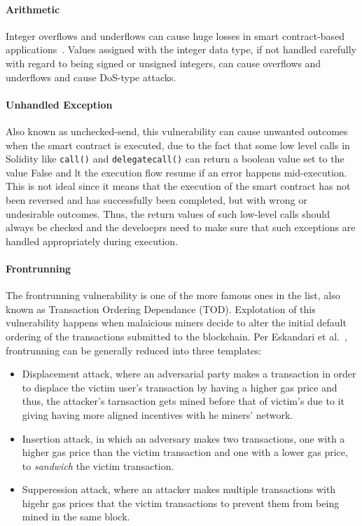             \paragraph{Arithmetic}
            Integer overflows and underflows can cause huge losses in smart contract-based applications~\cite{arithmeticVuln}.
            Values assigned with the integer data type, if not handled carefully with regard to being signed or unsigned integers, can cause overflows and underflows and cause DoS-type attacks.
            
            \paragraph{Unhandled Exception}
            Also known as unchecked-send, this vulnerability  can cause unwanted outcomes when the smart contract is executed, due to the fact that some low level calls in Solidity like \texttt{call()} and \texttt{delegatecall()} can return a boolean value set to the value False and lt the execution flow resume if an error happens mid-execution.
            This is not ideal since it means that the execution of the smart contract has not been reversed and has successfully been completed, but with wrong or undesirable outcomes.
            Thus, the return values of such low-level calls should always be checked and the develoeprs need to make sure that such exceptions are handled appropriately during execution.
            
            \paragraph{Frontrunning}
            The frontrunning vulnerability is one of the more famous ones in the list, also known as Transaction Ordering Dependance (TOD).
            Explotation of this vulnerability happens when malaicious miners decide to alter the initial default ordering of the transactions submitted to the blockchain.
            Per Eskandari et al.~\cite{eskandari2018frontrunning}, frontrunning can be generally reduced into three templates:
            \begin{itemize}
                \item Displacement attack, where an adversarial party makes a transaction in order to displace the victim user's transaction by having a higher gas price and thus, the attacker's tarnsaction gets mined before that of victim's due to it giving having more aligned incentives with he miners' network.
                \item Insertion attack, in which an adversary makes two transactions, one with a higher gas price than the victim transaction and one with a lower gas price, to \textit{sandwich} the victim transaction.~\cite{varun2022mitigating}
                \item Supperession attack, where an attacker makes multiple transactions with higehr gas prices that the victim transactions to prevent them from being mined in the same block.
            \end{itemize}


